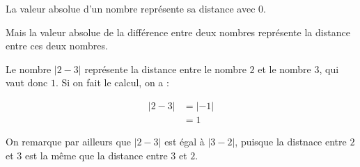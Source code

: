 \documentclass[11pt]{article}
\begin{document}
La valeur absolue d'un nombre représente sa distance avec \(0\).

Mais la valeur absolue de la différence entre deux nombres représente la
distance entre ces deux nombres.

\begin{ex}
  Le nombre $|2 - 3|$ représente la distance entre le nombre $2$ et le nombre $3$, qui vaut donc $1$. Si on fait le calcul, on a :

  \begin{align*}
    |2-3| &= |-1| \\
          &= 1
  \end{align*}

On remarque par ailleurs que $|2 - 3|$ est égal à $|3 - 2|$, puisque la distnace entre $2$ et $3$ est la même que la distance entre $3$ et $2$.
\end{ex}
\end{document}

